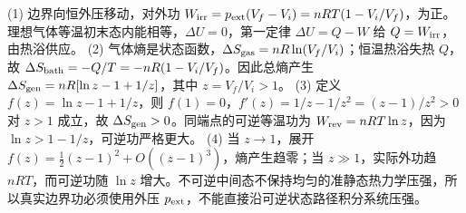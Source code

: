 (1) 边界向恒外压移动，对外功 \(W_{\rm irr}=p_{\rm ext}(V_f-V_i)=nRT(1-V_i/V_f)\)，为正。理想气体等温初末态内能相等，\(\Delta U=0\)，第一定律 \(\Delta U=Q-W\) 给 \(Q=W_{\rm irr}\)，由热浴供应。
(2) 气体熵是状态函数，\(\Delta S_{\rm gas}=nR\ln(V_f/V_i)\)；恒温热浴失热 \(Q\)，故 \(\Delta S_{\rm bath}=-Q/T=-nR(1-V_i/V_f)\)。因此总熵产生 \(\Delta S_{\rm gen}=nR[\ln z-1+1/z]\)，其中 \(z=V_f/V_i>1\)。
(3) 定义 \(f(z)=\ln z-1+1/z\)，则 \(f(1)=0\)，\(f'(z)=1/z-1/z^2=(z-1)/z^2>0\) 对 \(z>1\) 成立，故 \(\Delta S_{\rm gen}>0\)。同端点的可逆等温功为 \(W_{\rm rev}=nRT\ln z\)，因为 \(\ln z>1-1/z\)，可逆功严格更大。
(4) 当 \(z\to1\)，展开 \(f(z)=\frac12(z-1)^2+O((z-1)^3)\)，熵产生趋零；当 \(z\gg1\)，实际外功趋 \(nRT\)，而可逆功随 \(\ln z\) 增大。不可逆中间态不保持均匀的准静态热力学压强，所以真实边界功必须使用外压 \(p_{\rm ext}\)，不能直接沿可逆状态路径积分系统压强。
